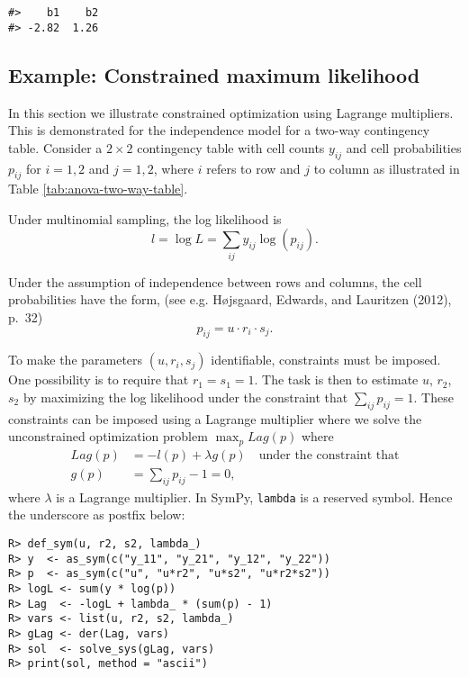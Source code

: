 \begin{verbatim}
#>    b1    b2 
#> -2.82  1.26
\end{verbatim}

\hypertarget{example-constrained-maximum-likelihood}{%
\subsection{Example: Constrained maximum likelihood}\label{example-constrained-maximum-likelihood}}

In this section we illustrate constrained optimization using Lagrange multipliers.
This is demonstrated for the independence model for a two-way contingency table.
Consider a \(2 \times 2\) contingency table with cell
counts \(y_{ij}\) and cell probabilities \(p_{ij}\) for \(i=1,2\) and \(j=1,2\),
where \(i\) refers to row and \(j\) to column as
illustrated in Table \ref{tab:anova-two-way-table}.

Under multinomial sampling, the log likelihood is
\[
 l = \log L = \sum_{ij} y_{ij} \log(p_{ij}).
\]

Under the assumption of independence between rows and columns, the cell
probabilities have the form, (see e.g. Højsgaard, Edwards, and Lauritzen (2012), p.~32)
\[
p_{ij}=u \cdot r_i \cdot s_j.
\]

To make the parameters \((u, r_i, s_j)\) identifiable, constraints
must be imposed. One possibility is to require that \(r_1=s_1=1\). The
task is then to estimate \(u\), \(r_2\), \(s_2\) by maximizing the log likelihood
under the constraint that \(\sum_{ij} p_{ij} = 1\). These constraints
can be
imposed using a Lagrange multiplier where we solve the
unconstrained optimization problem \(\max_p Lag(p)\) where
\begin{align}
  Lag(p) &= -l(p) + \lambda g(p) \quad \text{under the constraint that} \\
  g(p) &= \sum_{ij} p_{ij} - 1 = 0 ,
\end{align}
where \(\lambda\) is a Lagrange multiplier.
In SymPy, \texttt{lambda} is a reserved symbol. Hence the underscore as postfix below:

\begin{verbatim}
R> def_sym(u, r2, s2, lambda_)
R> y  <- as_sym(c("y_11", "y_21", "y_12", "y_22"))
R> p  <- as_sym(c("u", "u*r2", "u*s2", "u*r2*s2"))
R> logL <- sum(y * log(p))
R> Lag  <- -logL + lambda_ * (sum(p) - 1) 
R> vars <- list(u, r2, s2, lambda_)
R> gLag <- der(Lag, vars)
R> sol  <- solve_sys(gLag, vars)
R> print(sol, method = "ascii")
\end{verbatim}

